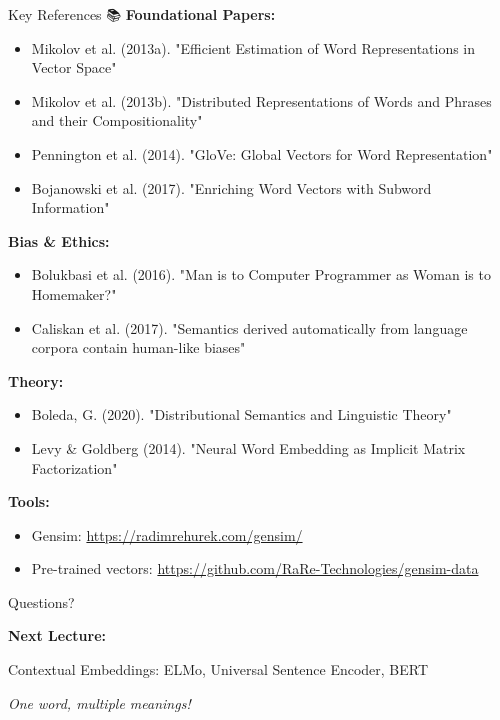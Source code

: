 \documentclass[aspectratio=169]{beamer}
\begin{document}
\begin{frame}[shrink=10]{Key References 📚}
\small
\textbf{Foundational Papers:}
\begin{itemize}\setlength{\itemsep}{0pt}
    \item Mikolov et al. (2013a). "Efficient Estimation of Word Representations in Vector Space"
    \item Mikolov et al. (2013b). "Distributed Representations of Words and Phrases and their Compositionality"
    \item Pennington et al. (2014). "GloVe: Global Vectors for Word Representation"
    \item Bojanowski et al. (2017). "Enriching Word Vectors with Subword Information"
\end{itemize}

\vspace{0.5em}
\textbf{Bias \& Ethics:}
\begin{itemize}\setlength{\itemsep}{0pt}
    \item Bolukbasi et al. (2016). "Man is to Computer Programmer as Woman is to Homemaker?"
    \item Caliskan et al. (2017). "Semantics derived automatically from language corpora contain human-like biases"
\end{itemize}

\vspace{0.5em}
\textbf{Theory:}
\begin{itemize}\setlength{\itemsep}{0pt}
    \item Boleda, G. (2020). "Distributional Semantics and Linguistic Theory"
    \item Levy \& Goldberg (2014). "Neural Word Embedding as Implicit Matrix Factorization"
\end{itemize}

\vspace{0.5em}
\textbf{Tools:}
\begin{itemize}\setlength{\itemsep}{0pt}
    \item Gensim: \url{https://radimrehurek.com/gensim/}
    \item Pre-trained vectors: \url{https://github.com/RaRe-Technologies/gensim-data}
\end{itemize}
\end{frame}

\begin{frame}{Questions? 🙋}
\begin{center}
\LARGE
\textbf{Next Lecture:}

\vspace{1em}
Contextual Embeddings: ELMo, Universal Sentence Encoder, BERT

\vspace{1em}
\textit{One word, multiple meanings!}
\end{center}
\end{frame}
\end{document}
